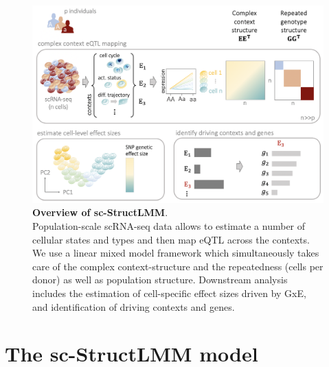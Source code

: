 \begin{figure}[htbp]
\centering
\includegraphics[width=15.5cm]{Chapter6/Fig/sc_structlmm_overview2.png}
\caption[Overview of sc-StructLMM]{\textbf{Overview of sc-StructLMM}.\\
Population-scale scRNA-seq data allows to estimate a number of cellular states and types and then map eQTL across the contexts.
We use a linear mixed model framework which simultaneously takes care of the complex context-structure and the repeatedness (cells per donor) as well as population structure.
Downstream analysis includes the estimation of cell-specific effect sizes driven by GxE, and identification of driving contexts and genes.}
\label{fig:sc_structlmm_overview}
\end{figure}



\clearpage

\section{The sc-StructLMM model} 

